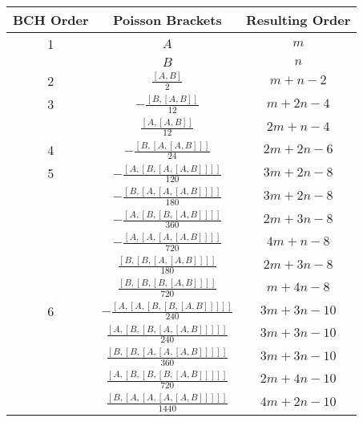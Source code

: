 \begin{table}[H]
  \small
  \centering
  \begin{tabular}{ccc}
    \toprule
      BCH Order & Poisson Brackets & Resulting Order \\
      \midrule
      1 & $A$ & $m$ \\
        & $B$ & $n$ \\
      \midrule
      2 & $\frac{\left[A,B\right]}{2}$ & $m + n - 2$ \\
      \midrule
      3 & $- \frac{\left[B,\left[A,B\right]\right]}{12}$ & $m + 2 n - 4$ \\
        & $\frac{\left[A,\left[A,B\right]\right]}{12}$ & $2 m + n - 4$ \\
      \midrule
      4 & $- \frac{\left[B,\left[A,\left[A,B\right]\right]\right]}{24}$ & $2 m + 2 n - 6$ \\
      \midrule
      5 & $- \frac{\left[A,\left[B,\left[A,\left[A,B\right]\right]\right]\right]}{120}$ & $3 m + 2 n - 8$ \\
        & $- \frac{\left[B,\left[A,\left[A,\left[A,B\right]\right]\right]\right]}{180}$ & $3 m + 2 n - 8$ \\
        & $- \frac{\left[A,\left[B,\left[B,\left[A,B\right]\right]\right]\right]}{360}$ & $2 m + 3 n - 8$ \\
        & $- \frac{\left[A,\left[A,\left[A,\left[A,B\right]\right]\right]\right]}{720}$ & $4 m + n - 8$ \\
        & $\frac{\left[B,\left[B,\left[A,\left[A,B\right]\right]\right]\right]}{180}$ & $2 m + 3 n - 8$ \\
        & $\frac{\left[B,\left[B,\left[B,\left[A,B\right]\right]\right]\right]}{720}$ & $m + 4 n - 8$ \\
      \midrule
      6 & $- \frac{\left[A,\left[A,\left[B,\left[B,\left[A,B\right]\right]\right]\right]\right]}{240}$ & $3 m + 3 n - 10$ \\
        & $\frac{\left[A,\left[B,\left[B,\left[A,\left[A,B\right]\right]\right]\right]\right]}{240}$ & $3 m + 3 n - 10$ \\
        & $\frac{\left[B,\left[B,\left[A,\left[A,\left[A,B\right]\right]\right]\right]\right]}{360}$ & $3 m + 3 n - 10$ \\
        & $\frac{\left[A,\left[B,\left[B,\left[B,\left[A,B\right]\right]\right]\right]\right]}{720}$ & $2 m + 4 n - 10$ \\
        & $\frac{\left[B,\left[A,\left[A,\left[A,\left[A,B\right]\right]\right]\right]\right]}{1440}$ & $4 m + 2 n - 10$ \\

\end{tabular}
\end{table}
